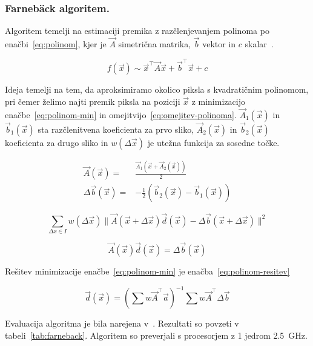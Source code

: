 \subsubsection{Farneb{\"a}ck algoritem.}
Algoritem temelji na estimaciji premika z razčlenjevanjem polinoma  po enačbi~\eqref{eq:polinom}, kjer je $\vec{A}$ simetrična matrika, $\vec{b}$ vektor in $c$ skalar~\cite{farneback2003two}.

\begin{equation}\label{eq:polinom}
	f(\vec{x}) \sim \vec{x}^\top \vec{A} \vec{x} + \vec{b}^\top \vec{x} + c
\end{equation}

Ideja temelji na tem, da aproksimiramo okolico piksla s kvadratičnim polinomom, pri čemer želimo najti premik piksla na poziciji $\vec{x}$ z minimizacijo enačbe~\eqref{eq:polinom-min} in omejitvijo~\eqref{eq:omejitev-polinoma}. $\vec{A}_1(\vec{x})$ in $\vec{b}_1(\vec{x})$ sta razčlenitvena koeficienta za prvo sliko, $\vec{A}_2(\vec{x})$ in $\vec{b}_2(\vec{x})$ koeficienta za drugo sliko in $w(\Delta\vec{x})$ je utežna funkcija za sosedne točke.

\begin{align}
\vec{A}(\vec{x}) = & \frac{\vec{A}_1(\vec{x} + \vec{A}_2(\vec{x}))}{2} \\
\Delta\vec{b}(\vec{x}) = & - \frac{1}{2}\left(\vec{b}_2(\vec{x}) - \vec{b}_1(\vec{x})\right) 
\end{align}

\begin{equation}\label{eq:polinom-min}
\sum_{\Delta x \in I} w(\Delta\vec{x}) \| \vec{A}(\vec{x} + \Delta\vec{x})\vec{d}(\vec{x}) - \Delta\vec{b}(\vec{x} +\Delta\vec{x}) \|^2
\end{equation}

\begin{equation}\label{eq:omejitev-polinoma}
\vec{A}(\vec{x})\vec{d}(\vec{x}) = \Delta\vec{b}(\vec{x})
\end{equation}

Rešitev minimizacije enačbe~\eqref{eq:polinom-min} je enačba~\eqref{eq:polinom-resitev}

\begin{equation}\label{eq:polinom-resitev}
 \vec{d}(\vec{x}) = \left( \sum w \vec{A}^\top \vec{a} \right)^{-1} \sum w \vec{A}^\top \Delta\vec{b}
\end{equation}

Evaluacija algoritma je bila narejena v~\cite{Geiger2012CVPR}. Rezultati so povzeti v tabeli~\ref{tab:farneback}. Algoritem so preverjali s procesorjem z 1 jedrom \@ \SI{2.5}{GHz}.

